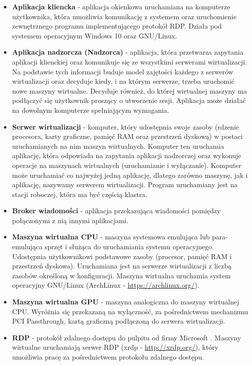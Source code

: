\documentclass[../wstep.tex]{subfiles}
\begin{document}
\begin{itemize}
  \item \textbf{Aplikacja kliencka} - aplikacja okienkowa uruchamiana na komputerze użytkownika, która umożliwia komunikację z systemem oraz uruchomienie zewnętrznego programu implementującego protokół RDP. Działa pod systemem operacyjnym Windows 10 oraz GNU/Linux.
  \item \textbf{Aplikacja nadzorcza (Nadzorca)} - aplikacja, która przetwarza zapytania aplikacji klienckiej oraz komunikuje się ze wszystkimi serwerami wirtualizacji. Na podstawie tych informacji buduje model zajętości każdego z serwerów wirtualizacji oraz decyduje kiedy, i na którym serwerze, trzeba uruchomić nowe maszyny wirtualne. Decyduje również, do której wirtualnej maszyny ma podłączyć się użytkownik proszący o utworzenie sesji. Aplikacja może działać na dowolnym komputerze spełniającym wymagania.
  \item \textbf{Serwer wirtualizacji} - komputer, który udostępnia swoje zasoby (rdzenie procesora, karty graficzne, pamięć RAM oraz przestrzeń dyskową) w postaci uruchamianych na nim maszyn wirtualnych. Komputer ten uruchamia aplikację, która odpowiada na zapytania aplikacji nadzorczej oraz wykonuje operacje na maszynach wirtualnych (uruchamianie i wyłączanie). Komputer może uruchamiać co najwyżej jedną aplikację, dlatego zarówno maszynę, jak i aplikację, nazywamy serwerem wirtualizacji. Program uruchamiany jest na stacji roboczej, która ma być częścią klastra.
  \item \textbf{Broker wiadomości} - aplikacja przekazująca wiadomości pomiędzy połączonymi z nią innymi aplikacjami.
  \item \textbf{Maszyna wirtualna CPU} - maszyna systemowa emulująca lub para-emulująca sprzęt i służąca do uruchamiania systemu operacyjnego. Udostępnia użytkownikowi podstawowe zasoby (procesor, pamięć RAM i przestrzeń dyskowa). Uruchamiana jest na serwerze wirtualizacji z liczbą zasobów określoną w konfiguracji. Maszyna wirtualna uruchamia system operacyjny GNU/Linux (ArchLinux - \url{https://archlinux.org/}).
  \item \textbf{Maszyna wirtualna GPU} - maszyna analogiczna do maszyny wirtualnej CPU. Wyróżnia się przekazaną na wyłączność, za pośrednictwem mechanizmu PCI Passthrough, kartą graficzną podłączoną do serwera wirtualizacji.
  \item \textbf{RDP} - protokół zdalnego dostępu do pulpitu od firmy Microsoft \parencite{rdp}. Maszyny wirtualne uruchamiają serwer RDP (xrdp - \url{http://xrdp.org/}), który umożliwia pracę za pośrednictwem protokołu zdalnego dostępu.

\end{itemize}
\end{document}
